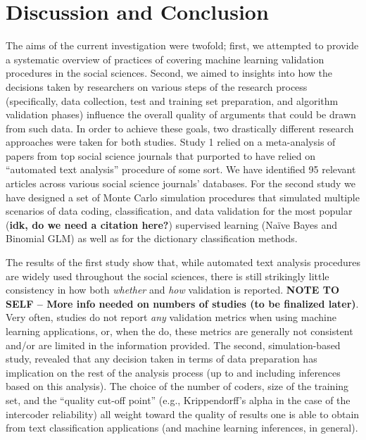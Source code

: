 \documentclass[man, 12pt, a4paper, nolmodern, noextraspace]{apa6}
\begin{document}
\section{Discussion and Conclusion}
    
The aims of the current investigation were twofold; first, we attempted to provide a systematic overview of practices of covering machine learning validation procedures in the social sciences. Second, we aimed to insights into how the decisions taken by researchers on various steps of the research process (specifically, data collection, test and training set preparation, and algorithm validation phases) influence the overall quality of arguments that could be drawn from such data. In order to achieve these goals, two drastically different research approaches were taken for both studies. Study 1 relied on a meta-analysis of papers from top social science journals that purported to have relied on ``automated text analysis'' procedure of some sort. We have identified 95 relevant articles across various social science journals' databases. For the second study we have designed a set of Monte Carlo simulation procedures that simulated multiple scenarios of data coding, classification, and data validation for the most popular (\textbf{idk, do we need a citation here?}) supervised learning  (Naïve Bayes and Binomial GLM) as well as for the dictionary classification methods.


The results of the first study show that, while automated text analysis procedures are widely used throughout the social sciences, there is still strikingly little consistency in how both \textit{whether} and \textit{how} validation is reported. \textbf{NOTE TO SELF -- More info needed on numbers of studies (to be finalized later)}. Very often, studies do not report \textit{any} validation metrics when using machine learning applications, or, when the do, these metrics are generally not consistent and/or are limited in the information provided. The second, simulation-based study, revealed that any decision taken in terms of data preparation has implication on the rest of the analysis process (up to and including inferences based on this analysis). The choice of the number of coders, size of the training set, and the ``quality cut-off point'' (e.g., Krippendorff's alpha in the case of the intercoder reliability) all weight toward the quality of results one is able to obtain from text classification applications (and machine learning inferences, in general).
\end{document}
